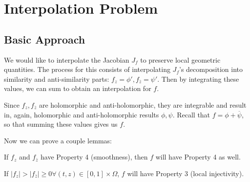 \section{Interpolation Problem}

\subsection{Basic Approach}

We would like to interpolate the Jacobian $J_f$ to preserve local geometric quantities. The process for this consists of interpolating $J_f$'s decomposition into similarity and anti-similarity parts: $f_z = \phi', f_{\overline{z}} = \psi'$. Then by integrating these values, we can sum to obtain an interpolation for $f$. 

Since $f_z, f_{\overline{z}}$ are holomorphic and anti-holomorphic, they are integrable and result in, again, holomorphic and anti-holomorphic results $\phi, \psi$. Recall that $f = \phi + \overline{\psi}$, so that summing these values gives us $f$. 

Now we can prove a couple lemmas:

\begin{lemma}
	If $f_z$ and $f_{\overline{z}}$ have Property 4 (smoothness), then $f$ will have Property 4 as well. 
\end{lemma}

\begin{lemma}
	If $|f_z| > |f_{\overline{z}}| \geq 0 \forall(t,z) \in [0,1] \times \Omega$, $f$ will have Property 3 (local injectivity).
\end{lemma}





